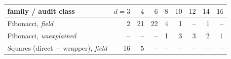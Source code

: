 \begin{tabular}{@{}lrrrrrrrr@{}}\toprule family / audit class & $d{=}3$ & $4$ & $6$ & $8$ & $10$ & $12$ & $14$ & $16$ \\\midrule
Fibonacci, \emph{field} & 2 & 21 & 22 & 4 & 1 & -- & 1 & -- \\
Fibonacci, \emph{unexplained} & -- & -- & -- & 1 & 3 & 3 & 2 & 1 \\
Squares (direct + wrapper), \emph{field} & 16 & 5 & -- & -- & -- & -- & -- & -- \\
\bottomrule\end{tabular}
